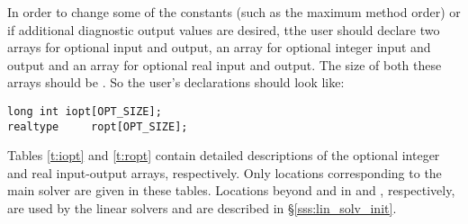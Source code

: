 In order to change some of the {\cvode} constants (such as the maximum method order) 
or if additional diagnostic output values are desired, tthe user should declare two 
arrays for optional input and output, an  array for optional integer 
input and output and an  array for optional real input and output. 
The size of both these arrays should be .
So the user's declarations should look like:
\begin{verbatim}
long int iopt[OPT_SIZE];
realtype     ropt[OPT_SIZE];
\end{verbatim}
Tables \ref{t:iopt} and \ref{t:ropt} contain 
detailed descriptions of the optional integer and real input-output arrays,
respectively. Only locations corresponding to the main {\cvode} solver are 
given in these tables. Locations beyond  and
 in  and , respectively, are used
by the linear solvers and are described in \S\ref{sss:lin_solv_init}.

